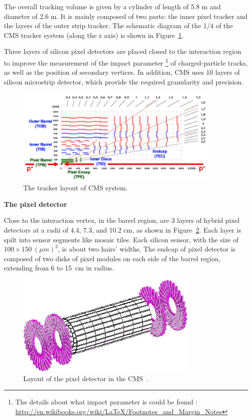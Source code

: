 The overall tracking volume is given by a cylinder of length of 5.8 m and diameter of 2.6 m. It is mainly
composed of two parts: the inner pixel tracker and the layers of the outer strip tracker. The schematic 
diagram of the 1/4 of the CMS tracker system (along the z axis) 
is shown in Figure~\ref{fig:trackerLayout}.     

Three layers of silicon pixel detectors are placed closed to the interaction region to improve the measurement of the impact parameter \footnote{The details about what impact parameter is could be found : \url{http://en.wikibooks.org/wiki/LaTeX/Footnotes_and_Margin_Notes}} of charged-particle tracks, as well as the position of secondary vertices. 
In addition, CMS uses 10 layers of silicon microstrip detector, which provide the required granularity and precision.  

\begin{figure}
\centering
\includegraphics[width=0.9\textwidth]{figures/TrackerLayout.png}
\caption{The tracker layout of CMS system.}
\label{fig:trackerLayout}
\end{figure}

{\bf The pixel detector}

Close to the interaction vertex, in the barrel region, are 3 layers of hybrid pixel detectors at a radii of 4.4, 7.3, and 10.2 cm, as shown in Figure~\ref{fig:pixel}. 
Each layer is spilt into sensor segments like mosaic tiles. Each silicon sensor, with the size of $100 \times 150~(\mu m)^2$, is about two hairs' widths.
The endcap of pixel detector is composed of two disks of pixel modules on each side of the barrel region, extending from 6 to 15~cm in radius. 

\begin{figure}[!htbp]
\centering
\includegraphics[width=0.8\textwidth]{figures/pixel.png}
\caption{Layout of the pixel detector in the CMS~\cite{expBook}.}
\label{fig:pixel}
\end{figure}


